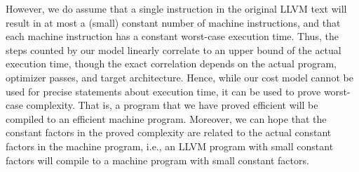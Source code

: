 \documentclass[acmsmall]{acmart}
\begin{document}
However, we do assume that a single instruction in the original LLVM text will result in at most a (small) constant number of machine instructions, and that each machine instruction has a constant worst-case execution time. Thus, the steps counted by our model linearly correlate to an upper bound of the actual execution time, though the exact correlation depends on the actual program, optimizer passes, and target architecture. Hence, while our cost model cannot be used for precise statements about execution time, it can be used to prove worst-case complexity. That is, a program that we have proved efficient will be compiled to an efficient machine program. 
Moreover, we can hope that the constant factors in the proved complexity are related to the actual constant factors in the machine program, i.e., an LLVM program with small constant factors will compile to a machine program with small constant factors.






\end{document}
